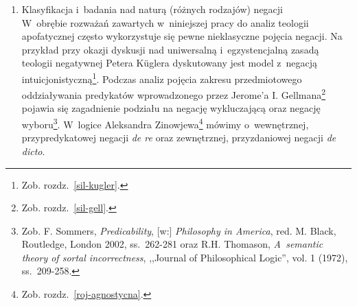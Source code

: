\begin{enumerate}[label = \arabic*), itemindent=6mm, labelwidth=4mm, labelsep=2mm, itemsep=1em, leftmargin=0mm]
\item Klasyfikacja i~badania nad naturą (różnych rodzajów) negacji\\
W~obrębie rozważań zawartych w~niniejszej pracy do analiz teologii apofatycznej często wykorzystuje się pewne nieklasyczne pojęcia negacji. Na przykład przy okazji dyskusji nad uniwersalną i~egzystencjalną zasadą teologii negatywnej Petera Küglera dyskutowany jest model z~negacją intuicjonistyczną\footnote{Zob. rozdz.~\ref{sil-kugler}.}. Podczas analiz pojęcia zakresu przedmiotowego oddziaływania predykatów wprowadzonego przez Jerome'a I. Gellmana\footnote{Zob. rozdz.~\ref{sil-gell}.} pojawia się zagadnienie podziału na negację wykluczającą oraz negację wyboru\footnote{Zob. F. Sommers, \textit{Predicability}, [w:] \textit{Philosophy in America}, red. M. Black, Routledge, London 2002, ss.~262-281 oraz R.H. Thomason, \textit{A~semantic theory of sortal incorrectness}, ,,Journal of Philosophical Logic'', vol. 1 (1972), ss.~209-258.}. W~logice Aleksandra Zinowjewa\footnote{Zob. rozdz.~\ref{roj-agnostycna}.} mówimy o~wewnętrznej, przypredykatowej negacji \textit{de re} oraz zewnętrznej, przyzdaniowej negacji \textit{de dicto}.

\end{enumerate}
